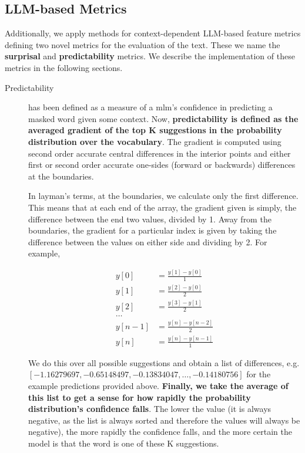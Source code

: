 \subsection*{LLM-based Metrics}\label{sec:llm_metrics}
Additionally, we apply methods for context-dependent LLM-based feature metrics defining two novel metrics for the evaluation of the text. These we name the \textbf{surprisal} and \textbf{predictability} metrics. We describe the implementation of these metrics in the following sections. 

\begin{description}
    \item[Predictability] has been defined as a measure of a \acrfull{mlm}'s confidence in predicting a masked word given some context. 
        Now, \textbf{predictability is defined as the averaged gradient of the top K suggestions in the probability distribution over the vocabulary}. 
        The gradient is computed using second order accurate central differences in the interior points and either first or second order accurate one-sides (forward or backwards) differences at the boundaries. 
        
        In layman's terms, at the boundaries, we calculate only the first difference. This means that at each end of the array, the gradient given is simply, the difference between the end two values, divided by 1. Away from the boundaries, the gradient for a particular index is given by taking the difference between the values on either side and dividing by 2. For example,

        \begin{align*}
            y[0] &= \frac{y[1] - y[0]}{1} \\
            y[1] &= \frac{y[2] - y[0]}{2} \\
            y[2] &= \frac{y[3] - y[1]}{2} \\
            \dots \\
            y[n-1] &= \frac{y[n] - y[n-2]}{2} \\
            y[n] &= \frac{y[n] - y[n-1]}{1}
        \end{align*}

        We do this over all possible suggestions and obtain a list of differences, e.g. \newline $[-1.16279697, -0.65148497, -0.13834047, \dots, -0.14180756]$ for the example predictions provided above. \textbf{Finally, we take the average of this list to get a sense for how rapidly the probability distribution's confidence falls}. The lower the value (it is always negative, as the list is always sorted and therefore the values will always be negative), the more rapidly the confidence falls, and the more certain the model is that the word is one of these K suggestions. 
        

\end{description}
